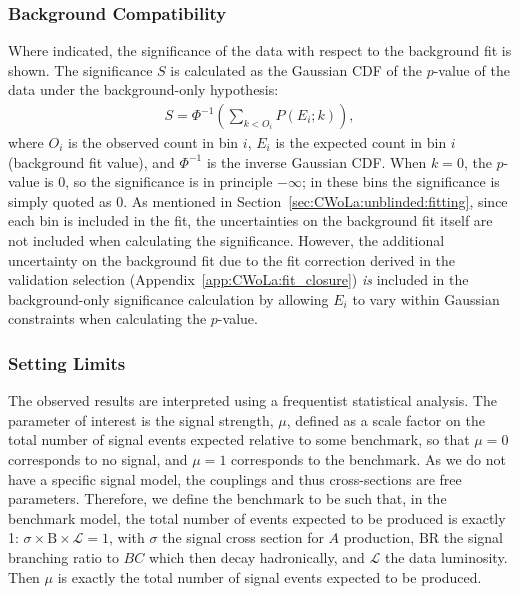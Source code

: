 \subsubsection{Background Compatibility}
Where indicated, the significance of the data with respect to the background fit is shown.
The significance $S$ is calculated as the Gaussian CDF of the $p$-value of the data under the background-only hypothesis:
\begin{align}
  S = \Phi^{-1}\left(\sum_{k<O_i} P(E_i;k)\right),
  \label{eqn:CWoLa:significance_def}
\end{align}
where $O_i$ is the observed count in bin $i$, $E_i$ is the expected count in bin $i$ (background fit value), and $\Phi^{-1}$ is the inverse Gaussian CDF.
When $k=0$, the $p$-value is $0$, so the significance is in principle $-\infty$; in these bins the significance is simply quoted as $0$.
As mentioned in Section~\ref{sec:CWoLa:unblinded:fitting}, since each bin is included in the fit, the uncertainties on the background fit itself are not included when calculating the significance.
However, the additional uncertainty on the background fit due to the fit correction derived in the validation selection (Appendix~\ref{app:CWoLa:fit_closure}) \textit{is} included in the background-only significance calculation by allowing $E_i$ to vary within Gaussian constraints when calculating the $p$-value.


\subsubsection{Setting Limits}

The observed results are interpreted using a frequentist statistical analysis.
The parameter of interest is the signal strength, $\mu$, defined as a scale factor on the total number of signal events expected relative to some benchmark, so that $\mu=0$ corresponds to no signal, and $\mu=1$ corresponds to the benchmark.
As we do not have a specific signal model, the couplings and thus cross-sections are free parameters.
Therefore, we define the benchmark to be such that, in the benchmark model, the total number of events expected to be produced is exactly 1: $\sigma\times\text{B}\times\mathcal{L}=1$, with $\sigma$ the signal cross section for $A$ production, $\text{BR}$ the signal branching ratio to $BC$ which then decay hadronically, and $\mathcal{L}$ the data luminosity.
Then $\mu$ is exactly the total number of signal events expected to be produced.

